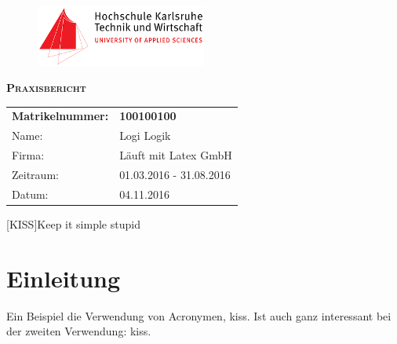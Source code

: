 \documentclass[a4paper, 12pt, headsepline=true]{scrartcl} %
\begin{document}
\begin{titlepage}
	\begin{figure}
		\includegraphics[width=0.5\textwidth,right]{figures/hska-logo}
		\vspace{3cm}
	\end{figure}


	{\scshape\huge\bfseries Praxisbericht\par}

	\vspace{2cm}
	
	
	\renewcommand{\arraystretch}{1.5}
	\begin{tabularx}{\columnwidth}{XX}
		\textbf{Matrikelnummer:} 		& \textbf{100100100}\\
		Name: 							& Logi Logik\\
		Firma:							& Läuft mit Latex GmbH \\
		Zeitraum:						& 01.03.2016 - 31.08.2016 \\
		Datum:							& 04.11.2016 
	\end{tabularx}
\end{titlepage}

\newpage

\tableofcontents
\newpage

\begin{acronym}[KISS]
	[KISS]{Keep it simple stupid}
	
\end{acronym}

\clearpage

\listoffigures
\clearpage


\section{Einleitung}

Ein Beispiel die Verwendung von Acronymen, \ac{kiss}. Ist auch ganz interessant bei der zweiten Verwendung: \ac{kiss}.
\end{document}

